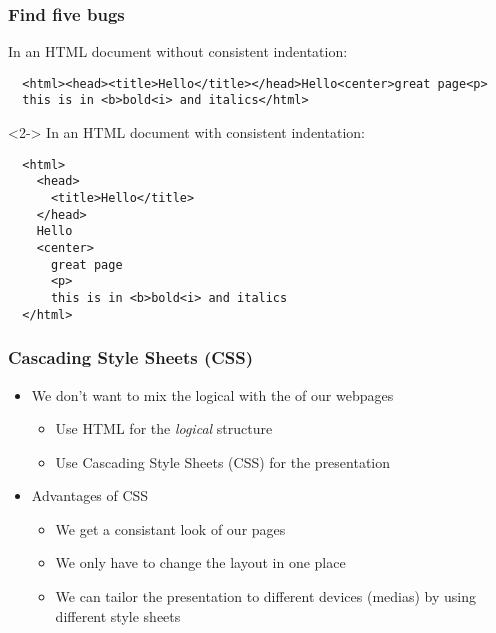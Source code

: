 \documentclass[dvipsnames]{beamer}
\begin{document}
\begin{frame}[fragile]
\frametitle{Find five bugs}

In an HTML document without consistent indentation:
\begin{footnotesize}
\begin{verbatim}
  <html><head><title>Hello</title></head>Hello<center>great page<p>
  this is in <b>bold<i> and italics</html>
\end{verbatim}
\end{footnotesize}
\begin{uncoverenv}<2->
  In an HTML document with consistent indentation:
  \begin{footnotesize}
\begin{verbatim}
  <html>
    <head>
      <title>Hello</title>
    </head>
    Hello
    <center>
      great page
      <p>
      this is in <b>bold<i> and italics
  </html>
\end{verbatim}
   \end{footnotesize}
 \end{uncoverenv}
\end{frame}


\begin{frame}
  \frametitle{Cascading Style Sheets (CSS)}
  
  \begin{itemize}
  \item We don't want to mix the logical  with the
     of our webpages
    \begin{itemize}
    \item Use HTML for the \emph{logical} structure
    \item Use Cascading Style Sheets (CSS) for the presentation
    \end{itemize}
  \item Advantages of CSS
    \begin{itemize}
    \item We get a consistant look of our pages
    \item We only have to change the layout in one place
    \item We can tailor the presentation to different devices (medias)
      by using different style sheets
    \end{itemize}
\end{itemize}
  
\end{frame}
\end{document}
